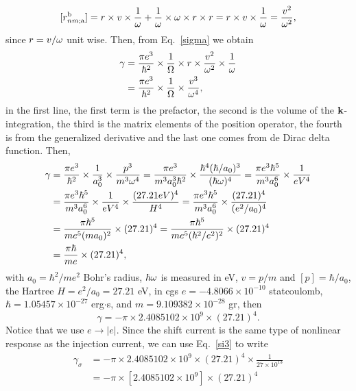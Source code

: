 \documentclass[12pt]{article}
\numberwithin{equation}{section}
\begin{document}
\begin{enumerate}
\begin{align}\label{ugd}
[r^{\mathrm{b}}_{nm;\mathrm{a}}]= r\times v \times \frac{1}{\omega}
+\frac{1}{\omega}\times\omega\times r\times r
=r\times v \times \frac{1}{\omega}=\frac{v^2}{\omega^2},
\end{align}
since $r=v/\omega$ unit wise. Then, from Eq.~\eqref{sigma} we obtain
\begin{align}\label{unpn}
\gamma  
&=
\frac{\pi e^3}{\hbar^2}\times\frac{1}{\Omega}
\times r \times\frac{v^2}{\omega^2}
\times \frac{1}{\omega}
\nonumber\\
&=
\frac{\pi e^3}{\hbar^2}\times\frac{1}{\Omega}
\times\frac{v^3}{\omega^4}
,
\end{align}   
in the first line, the first term is the prefactor, the second is the volume of the 
$\mathbf{k}$-integration, the third
is the matrix elements of the position operator, the fourth
is from the generalized derivative and the last 
one comes from de Dirac delta function. 
Then,
\begin{align}\label{nunpn1}
\gamma 
&=
\frac{\pi e^3}{\hbar^2}\times\frac{1}{a^3_0}
\times\frac{p^3}{m^3\omega^4}
=
\frac{\pi e^3}{m^3a^3_0\hbar^2}
\times\frac{\hbar^4(\hbar/a_0)^3}{(\hbar\omega)^4}
=
\frac{\pi e^3\hbar^5}{m^3a^6_0}
\times\frac{1}{eV^4}
\nonumber\\
&
=
\frac{\pi e^3\hbar^5}{m^3a^6_0}
\times\frac{1}{eV^4}
\times\frac{(27.21 eV)^4}{H^4}
=
\frac{\pi e^3\hbar^5}{m^3a^6_0}
\times\frac{(27.21)^4}{(e^2/a_0)^4}
\nonumber\\
&
=\frac{\pi \hbar^5}{me^5(ma_0)^2}
\times (27.21)^4 
=\frac{\pi \hbar^5}{me^5(\hbar^2/e^2)^2}
\times (27.21)^4 
\nonumber\\
&
=\frac{\pi \hbar}{me}
\times (27.21)^4 
\nonumber
,
\end{align} 
with $a_0=\hbar^2/me^2$ Bohr's radius, $\hbar\omega$ is measured in eV, $v=p/m$ and 
$[p]=\hbar/a_0$, the Hartree $H=e^2/a_0=27.21$ eV, in cgs 
$e=-4.8066\times 10^{-10}$ statcoulomb, $\hbar=1.05457\times 
10^{-27}$ erg$\cdot$s, and $m=9.109382\times 10^{-28}$ gr, then 
\begin{equation}\label{c45}
\gamma=-\pi\times 2.4085102\times 10^9\times (27.21)^4 
.  
\end{equation} 
Notice that we use $e\to|e|$.
Since the shift current is the same type of nonlinear response as the
injection current, we can
use
Eq.~\eqref{si3} to write
\begin{align}\label{c46}
\gamma_\sigma &=-\pi\times 2.4085102\times 10^9\times (27.21)^4 
\times \frac{1}{27\times 10^{13}} 
\nonumber\\
 &=-\pi\times [2.4085102\times 10^9]\times (27.21)^4 

\end{align}
\end{enumerate}
\end{document}
